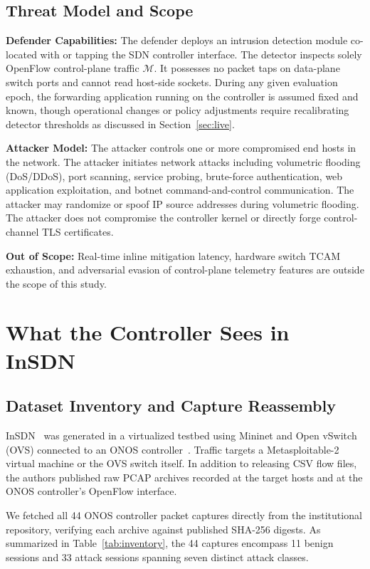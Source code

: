 \documentclass[journal]{IEEEtran}
\begin{document}
\subsection{Threat Model and Scope}
\textbf{Defender Capabilities:} The defender deploys an intrusion detection module co-located with or tapping the SDN controller interface. The detector inspects solely OpenFlow control-plane traffic $\mathcal{M}$. It possesses no packet taps on data-plane switch ports and cannot read host-side sockets. During any given evaluation epoch, the forwarding application running on the controller is assumed fixed and known, though operational changes or policy adjustments require recalibrating detector thresholds as discussed in Section~\ref{sec:live}.

\textbf{Attacker Model:} The attacker controls one or more compromised end hosts in the network. The attacker initiates network attacks including volumetric flooding (DoS/DDoS), port scanning, service probing, brute-force authentication, web application exploitation, and botnet command-and-control communication. The attacker may randomize or spoof IP source addresses during volumetric flooding. The attacker does not compromise the controller kernel or directly forge control-channel TLS certificates.

\textbf{Out of Scope:} Real-time inline mitigation latency, hardware switch TCAM exhaustion, and adversarial evasion of control-plane telemetry features are outside the scope of this study.

\section{What the Controller Sees in InSDN}\label{sec:gap}
\subsection{Dataset Inventory and Capture Reassembly}
InSDN~\cite{elsayed2020insdn} was generated in a virtualized testbed using Mininet and Open vSwitch (OVS) connected to an ONOS controller~\cite{berde2014onos}. Traffic targets a Metasploitable-2 virtual machine or the OVS switch itself. In addition to releasing CSV flow files, the authors published raw PCAP archives recorded at the target hosts and at the ONOS controller's OpenFlow interface.

We fetched all 44 ONOS controller packet captures directly from the institutional repository, verifying each archive against published SHA-256 digests. As summarized in Table~\ref{tab:inventory}, the 44 captures encompass 11 benign sessions and 33 attack sessions spanning seven distinct attack classes.
\end{document}
